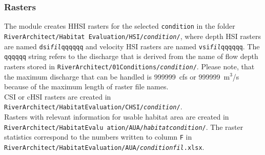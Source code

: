 \subsubsection{Rasters}\label{sec:heoutputhhsi}
The module creates HHSI rasters for the selected \texttt{condition} in the folder \texttt{RiverArchitect/Habitat Evaluation/HSI/\textit{condition}/}, where depth HSI rasters are named \texttt{dsi{\myUnderscore}\textit{fil}qqqqqq} and velocity HSI rasters are named \texttt{vsi{\myUnderscore}\textit{fil}qqqqqq}. The \texttt{qqqqqq} string refers to the discharge that is derived from the name of flow depth rasters stored in \texttt{RiverArchitect/01{\myUnderscore}Conditions/\textit{condition}/}. Please note, that the maximum discharge that can be handled is 999999~cfs or 999999~m$^3$/s because of the maximum length of raster file names.\\
CSI or cHSI rasters are created in \texttt{RiverArchitect/HabitatEvaluation/CHSI/\textit{condition}/}.\\
Rasters with relevant information for usable habitat area are created in \texttt{RiverArchitect/HabitatEvalu ation/AUA/\textit{habitat{\myUnderscore}condition}/}. The raster statistics correspond to the numbers written to column \texttt{F} in \texttt{RiverArchitect/HabitatEvaluation/AUA/\textit{condition}{\myUnderscore}\textit{fil}.xlsx}.\\


